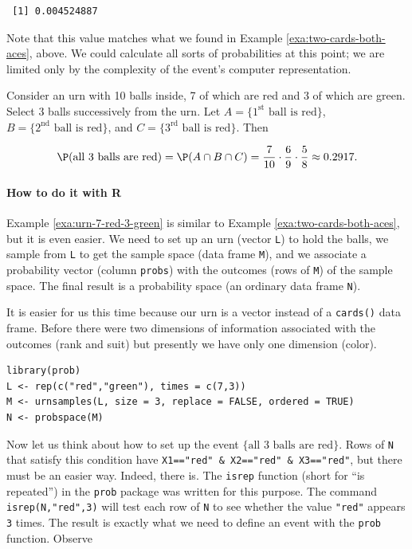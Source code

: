 \documentclass[captions=tableheading]{scrbook}
\begin{document}
\begin{verbatim}
 [1] 0.004524887
\end{verbatim}

Note that this value matches what we found in Example \ref{exa:two-cards-both-aces}, above. We could calculate all sorts of probabilities at this point; we are limited only by the complexity of the event's computer representation. 


\begin{example}
\label{exa:urn-7-red-3-green}
Consider an urn with 10 balls inside, 7 of which are red and 3 of which are green. Select 3 balls successively from the urn. Let \( A = \{ 1^{\mathrm{st}} \mbox{ ball is red} \} \), \( B = \{ 2^{\mathrm{nd}} \mbox{ ball is red} \} \), and \( C = \{ 3^{\mathrm{rd}} \mbox{ ball is red} \} \). Then

\[
\P(\mbox{all 3 balls are red})=\P(A\cap B\cap C)=\frac{7}{10}\cdot\frac{6}{9}\cdot\frac{5}{8}\approx 0.2917.
\]

\end{example}

\paragraph*{How to do it with \textsf{R}}

Example \ref{exa:urn-7-red-3-green} is similar to Example \ref{exa:two-cards-both-aces}, but it is even easier. We need to set up an urn (vector \texttt{L}) to hold the balls, we sample from \texttt{L} to get the sample space (data frame \texttt{M}), and we associate a probability vector (column \texttt{probs}) with the outcomes (rows of \texttt{M}) of the sample space. The final result is a probability space (an ordinary data frame \texttt{N}).

It is easier for us this time because our urn is a vector instead of a \texttt{cards()} data frame. Before there were two dimensions of information associated with the outcomes (rank and suit) but presently we have only one dimension (color).


\begin{verbatim}
library(prob)
L <- rep(c("red","green"), times = c(7,3))
M <- urnsamples(L, size = 3, replace = FALSE, ordered = TRUE)
N <- probspace(M)
\end{verbatim}

Now let us think about how to set up the event \(\{ \mbox{all 3 balls are red}\} \). Rows of \texttt{N} that satisfy this condition have \texttt{X1=="red" \& X2=="red" \& X3=="red"}, but there must be an easier way. Indeed, there is. The \texttt{isrep} function (short for ``is repeated'') in the \texttt{prob} package was written for this purpose. The command \texttt{isrep(N,"red",3)} will test each row of \texttt{N} to see whether the value \texttt{"red"} appears \texttt{3} times. The result is exactly what we need to define an event with the \texttt{prob} function. Observe
\end{document}
